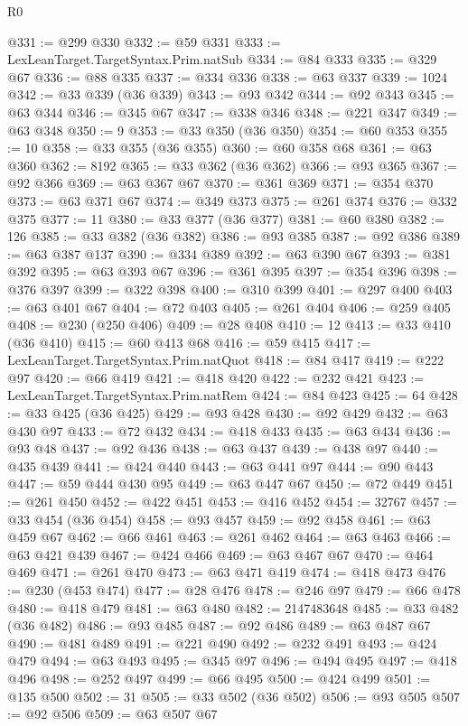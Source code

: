 \begin{lexlean}{R0}
\begin{coremodule}
@331 := @299 @330
@332 := @59 @331
@333 := LexLeanTarget.TargetSyntax.Prim.natSub
@334 := @84 @333
@335 := @329 @67
@336 := @88 @335
@337 := @334 @336
@338 := @63 @337
@339 := 1024
@342 := @33 @339 (@36 @339)
@343 := @93 @342
@344 := @92 @343
@345 := @63 @344
@346 := @345 @67
@347 := @338 @346
@348 := @221 @347
@349 := @63 @348
@350 := 9
@353 := @33 @350 (@36 @350)
@354 := @60 @353
@355 := 10
@358 := @33 @355 (@36 @355)
@360 := @60 @358 @68
@361 := @63 @360
@362 := 8192
@365 := @33 @362 (@36 @362)
@366 := @93 @365
@367 := @92 @366
@369 := @63 @367 @67
@370 := @361 @369
@371 := @354 @370
@373 := @63 @371 @67
@374 := @349 @373
@375 := @261 @374
@376 := @332 @375
@377 := 11
@380 := @33 @377 (@36 @377)
@381 := @60 @380
@382 := 126
@385 := @33 @382 (@36 @382)
@386 := @93 @385
@387 := @92 @386
@389 := @63 @387 @137
@390 := @334 @389
@392 := @63 @390 @67
@393 := @381 @392
@395 := @63 @393 @67
@396 := @361 @395
@397 := @354 @396
@398 := @376 @397
@399 := @322 @398
@400 := @310 @399
@401 := @297 @400
@403 := @63 @401 @67
@404 := @72 @403
@405 := @261 @404
@406 := @259 @405
@408 := @230 (@250 @406)
@409 := @28 @408
@410 := 12
@413 := @33 @410 (@36 @410)
@415 := @60 @413 @68
@416 := @59 @415
@417 := LexLeanTarget.TargetSyntax.Prim.natQuot
@418 := @84 @417
@419 := @222 @97
@420 := @66 @419
@421 := @418 @420
@422 := @232 @421
@423 := LexLeanTarget.TargetSyntax.Prim.natRem
@424 := @84 @423
@425 := 64
@428 := @33 @425 (@36 @425)
@429 := @93 @428
@430 := @92 @429
@432 := @63 @430 @97
@433 := @72 @432
@434 := @418 @433
@435 := @63 @434
@436 := @93 @48
@437 := @92 @436
@438 := @63 @437
@439 := @438 @97
@440 := @435 @439
@441 := @424 @440
@443 := @63 @441 @97
@444 := @90 @443
@447 := @59 @444 @430 @95
@449 := @63 @447 @67
@450 := @72 @449
@451 := @261 @450
@452 := @422 @451
@453 := @416 @452
@454 := 32767
@457 := @33 @454 (@36 @454)
@458 := @93 @457
@459 := @92 @458
@461 := @63 @459 @67
@462 := @66 @461
@463 := @261 @462
@464 := @63 @463
@466 := @63 @421 @439
@467 := @424 @466
@469 := @63 @467 @67
@470 := @464 @469
@471 := @261 @470
@473 := @63 @471 @419
@474 := @418 @473
@476 := @230 (@453 @474)
@477 := @28 @476
@478 := @246 @97
@479 := @66 @478
@480 := @418 @479
@481 := @63 @480
@482 := 2147483648
@485 := @33 @482 (@36 @482)
@486 := @93 @485
@487 := @92 @486
@489 := @63 @487 @67
@490 := @481 @489
@491 := @221 @490
@492 := @232 @491
@493 := @424 @479
@494 := @63 @493
@495 := @345 @97
@496 := @494 @495
@497 := @418 @496
@498 := @252 @497
@499 := @66 @495
@500 := @424 @499
@501 := @135 @500
@502 := 31
@505 := @33 @502 (@36 @502)
@506 := @93 @505
@507 := @92 @506
@509 := @63 @507 @67

\end{coremodule}
\end{lexlean}

